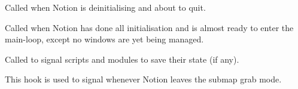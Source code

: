 \begin{function}
    \hookparams{()}
    \begin{funcdesc}
      Called when Notion is deinitialising and about to quit.
    \end{funcdesc}
\end{function}


\begin{function}
    \hookparams{()}
    \begin{funcdesc}
      Called when Notion has done all initialisation and is almost ready to
      enter the main-loop, except no windows are yet being managed.
    \end{funcdesc}
\end{function}


\begin{function}
    \hookparams{()}
    \begin{funcdesc}
      Called to signal scripts and modules to save their state (if any).
    \end{funcdesc}
\end{function}


\begin{function}
    \hookparams{()}
    \begin{funcdesc}
      This hook is used to signal whenever Notion leaves the submap grab mode.
    \end{funcdesc}
\end{function}


